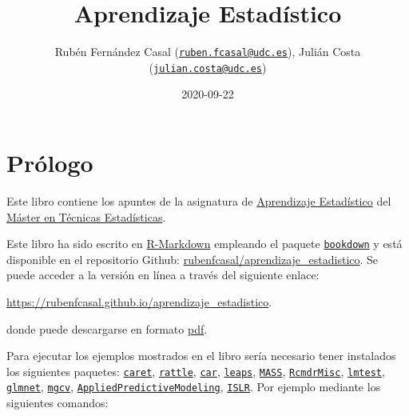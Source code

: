 \documentclass[]{book}
\title{Aprendizaje Estadístico}
\author{Rubén Fernández Casal
(\href{mailto:ruben.fcasal@udc.es}{\nolinkurl{ruben.fcasal@udc.es}}),
Julián Costa
(\href{mailto:julian.costa@udc.es}{\nolinkurl{julian.costa@udc.es}})}
\date{2020-09-22}
\theoremstyle{break}
\theoremstyle{definition}
\theoremstyle{definition}
\theoremstyle{definition}
\theoremstyle{remark}
\begin{document}
\maketitle

{
\setcounter{tocdepth}{1}
\tableofcontents
}
\chapter*{Prólogo}\label{pruxf3logo}

Este libro contiene los apuntes de la asignatura de
\href{http://eamo.usc.es/pub/mte/index.php?option=com_content\&view=article\&id=74}{Aprendizaje
Estadístico} del \href{http://eio.usc.es/pub/mte}{Máster en Técnicas
Estadísticas}.

Este libro ha sido escrito en
\href{http://rmarkdown.rstudio.com}{R-Markdown} empleando el paquete
\href{https://bookdown.org/yihui/bookdown/}{\texttt{bookdown}} y está
disponible en el repositorio Github:
\href{https://github.com/rubenfcasal/aprendizaje_estadistico}{rubenfcasal/aprendizaje\_estadistico}.
Se puede acceder a la versión en línea a través del siguiente enlace:

\url{https://rubenfcasal.github.io/aprendizaje_estadistico}.

donde puede descargarse en formato
\href{https://rubenfcasal.github.io/aprendizaje_estadistico/aprendizaje_estadistico.pdf}{pdf}.

Para ejecutar los ejemplos mostrados en el libro sería necesario tener
instalados los siguientes paquetes:
\href{https://CRAN.R-project.org/package=caret}{\texttt{caret}},
\href{https://CRAN.R-project.org/package=rattle}{\texttt{rattle}},
\href{https://CRAN.R-project.org/package=car}{\texttt{car}},
\href{https://CRAN.R-project.org/package=leaps}{\texttt{leaps}},
\href{https://CRAN.R-project.org/package=MASS}{\texttt{MASS}},
\href{https://CRAN.R-project.org/package=RcmdrMisc}{\texttt{RcmdrMisc}},
\href{https://CRAN.R-project.org/package=lmtest}{\texttt{lmtest}},
\href{https://CRAN.R-project.org/package=glmnet}{\texttt{glmnet}},
\href{https://CRAN.R-project.org/package=mgcv}{\texttt{mgcv}},
\href{https://CRAN.R-project.org/package=AppliedPredictiveModeling}{\texttt{AppliedPredictiveModeling}},
\href{https://CRAN.R-project.org/package=ISLR}{\texttt{ISLR}}. Por
ejemplo mediante los siguientes comandos:
\end{document}
